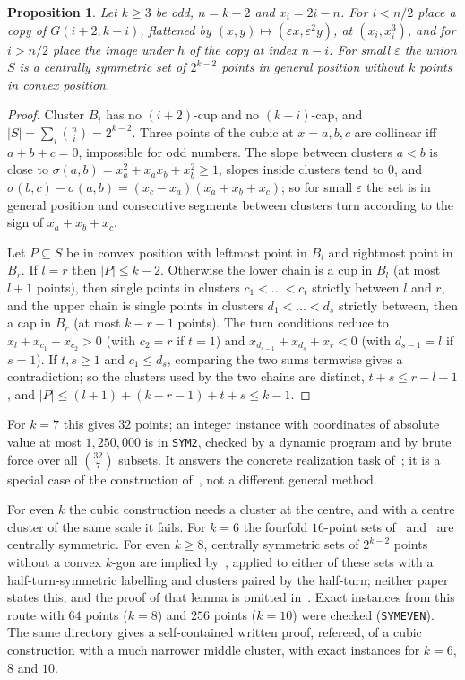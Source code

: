 \documentclass[11pt]{article}
\newtheorem{proposition}[theorem]{Proposition}
\theoremstyle{remark}
\begin{document}
\begin{proposition}\label{prop:B}
Let $k\ge3$ be odd, $n=k-2$ and $x_i=2i-n$. For $i<n/2$ place a copy of $G(i+2,k-i)$, flattened by
$(x,y)\mapsto(\varepsilon x,\varepsilon^2y)$, at $(x_i,x_i^3)$, and for $i>n/2$ place the image under $h$ of the copy at
index $n-i$. For small $\varepsilon$ the union $S$ is a centrally symmetric set of $2^{k-2}$ points in general position
without $k$ points in convex position.
\end{proposition}
\begin{proof}
Cluster $B_i$ has no $(i+2)$-cup and no $(k-i)$-cap, and $|S|=\sum_i\binom{n}{i}=2^{k-2}$. Three points of the cubic at
$x=a,b,c$ are collinear iff $a+b+c=0$, impossible for odd numbers. The slope between clusters $a<b$ is close to
$\sigma(a,b)=x_a^2+x_ax_b+x_b^2\ge1$, slopes inside clusters tend to $0$, and
$\sigma(b,c)-\sigma(a,b)=(x_c-x_a)(x_a+x_b+x_c)$; so for small $\varepsilon$ the set is in general position and
consecutive segments between clusters turn according to the sign of $x_a+x_b+x_c$.

Let $P\subseteq S$ be in convex position with leftmost point in $B_l$ and rightmost point in $B_r$. If $l=r$ then
$|P|\le k-2$. Otherwise the lower chain is a cup in $B_l$ (at most $l+1$ points), then single points in clusters
$c_1<\dots<c_t$ strictly between $l$ and $r$, and the upper chain is single points in clusters $d_1<\dots<d_s$ strictly
between, then a cap in $B_r$ (at most $k-r-1$ points). The turn conditions reduce to $x_l+x_{c_1}+x_{c_2}>0$ (with
$c_2=r$ if $t=1$) and $x_{d_{s-1}}+x_{d_s}+x_r<0$ (with $d_{s-1}=l$ if $s=1$). If $t,s\ge1$ and $c_1\le d_s$, comparing
the two sums termwise gives a contradiction; so the clusters used by the two chains are distinct, $t+s\le r-l-1$, and
$|P|\le(l+1)+(k-r-1)+t+s\le k-1$.
\end{proof}
For $k=7$ this gives $32$ points; an integer instance with coordinates of absolute value at most $1{,}250{,}000$ is in
\texttt{SYM2}, checked by a dynamic program and by brute force over all $\binom{32}{7}$ subsets. It answers the concrete
realization task of~\cite{SMQH25}; it is a special case of the construction of~\cite{BB25}, not a different general
method.

For even $k$ the cubic construction needs a cluster at the centre, and with a centre cluster of the same scale it fails.
For $k=6$ the fourfold $16$-point sets of~\cite[App.~C]{SMQH25} and~\cite[Fig.~3.28]{Mac25} are centrally symmetric. For
even $k\ge8$, centrally symmetric sets of $2^{k-2}$ points without a convex $k$-gon are implied by~\cite[Lemma~14]{BB25},
applied to either of these sets with a half-turn-symmetric labelling and clusters paired by the half-turn; neither paper
states this, and the proof of that lemma is omitted in~\cite{BB25}. Exact instances from this route with $64$ points
($k=8$) and $256$ points ($k=10$) were checked (\texttt{SYMEVEN}). The same directory gives a
self-contained written proof, refereed, of a cubic construction with a much narrower middle cluster, with exact
instances for $k=6$, $8$ and $10$.
\end{document}
